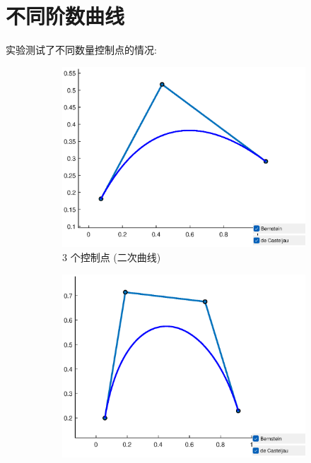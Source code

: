 \documentclass[12pt,a4paper]{report}
\begin{document}
        \section{不同阶数曲线}
            实验测试了不同数量控制点的情况:

            \begin{figure}[htbp]
                \centering
                \begin{subfigure}{0.3\textwidth}
                    \centering
                    \includegraphics[width=\textwidth]{fig/both_algorithms.eps}
                    \caption{3 个控制点 (二次曲线)}
                \end{subfigure}
                \hfill
                \begin{subfigure}{0.3\textwidth}
                    \centering
                    \includegraphics[width=\textwidth]{fig/4_points.eps}

\end{subfigure}
\end{figure}
\end{document}

